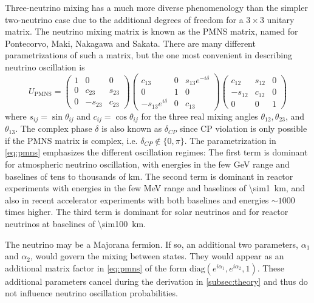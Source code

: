 Three-neutrino mixing has a much more diverse phenomenology
than the simpler two-neutrino case
due to the additional degrees of freedom for a $3\times3$ unitary matrix.
The neutrino mixing matrix is known as the PMNS matrix,
named for Pontecorvo, Maki, Nakagawa and Sakata.
There are many different parametrizations of such a matrix,
but the one most convenient in describing neutrino oscillation is
\begin{equation}\label{eq:pmns}
    U_{\text{PMNS}} =
    \begin{pmatrix}
        1 & 0 & 0 \\
        0 & c_{23} & s_{23} \\
        0 & -s_{23} & c_{23}
    \end{pmatrix}
    \begin{pmatrix}
        c_{13} & 0 & s_{13}e^{-i\delta} \\
        0 & 1 & 0 \\
        -s_{13}e^{i\delta} & 0 & c_{13}
    \end{pmatrix}
    \begin{pmatrix}
        c_{12} & s_{12} & 0 \\
        -s_{12} & c_{12} & 0 \\
        0 & 0 & 1
    \end{pmatrix}
\end{equation}
where $s_{ij} = \sin\theta_{ij}$ and $c_{ij} = \cos\theta_{ij}$
for the three real mixing angles
$\theta_{12},\theta_{23}$, and $\theta_{13}$.
The complex phase $\delta$ is also known as $\delta_{CP}$
since CP violation is only possible if the PMNS matrix is complex,
i.e. $\delta_{CP} \notin \{0, \pi\}$.
The parametrization in \cref{eq:pmns} emphasizes the different oscillation regimes:
The first term is dominant for atmospheric neutrino oscillation,
with energies in the few \si{\GeV} range
and baselines of tens to thousands of \si{\km}.
The second term is dominant in reactor experiments
with energies in the few \si{\MeV} range
and baselines of \SI{\sim1}{\km},
and also in recent accelerator experiments
with both baselines and energies ${\sim}1000$ times higher.
The third term is dominant for solar neutrinos
and for reactor neutrinos at baselines of \SI{\sim100}{\km}.

The neutrino may be a Majorana fermion.
If so, an additional two parameters, $\alpha_1$ and $\alpha_2$,
would govern the mixing between states.
They would appear as an additional matrix factor in \cref{eq:pmns}
of the form $\text{diag}(e^{i\alpha_1}, e^{i\alpha_2}, 1)$.
These additional parameters cancel
during the derivation in \cref{subsec:theory}
and thus do not influence neutrino oscillation probabilities.

